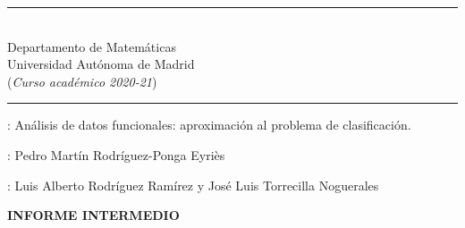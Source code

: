 \documentclass[a4paper,oneside,11pt,leqno]{article}
\begin{document}
\hrule
\vskip 5pt

 \\
Departamento de Matemáticas\\
Universidad Autónoma de Madrid\\
\noindent ({\it Curso académico 2020-21})
\vskip 6pt \hrule

\vskip 1mm

: Análisis de datos funcionales: aproximación al problema de clasificación.

\vskip 1mm

: Pedro Martín Rodríguez-Ponga Eyriès

\vskip 1mm

: Luis Alberto Rodríguez Ramírez y José Luis Torrecilla Noguerales

\vskip 2mm

\centerline{\bf INFORME INTERMEDIO}

\vskip 2mm
\end{document}
